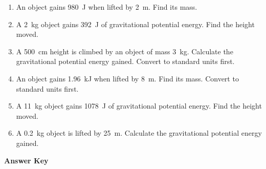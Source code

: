 \documentclass[12pt]{article}
\begin{document}
\begin{enumerate}[itemsep=1.2em]
\item An object gains \SI{980}{\joule} when lifted by \SI{2}{\metre}.  
Find its mass.

\item A \SI{2}{\kilogram} object gains \SI{392}{\joule} of gravitational potential energy.  
Find the height moved.

\item A \SI{500}{\centi\metre} height is climbed by an object of mass \SI{3}{\kilogram}.  
Calculate the gravitational potential energy gained. Convert to standard units first.

\item An object gains \SI{1.96}{\kilo\joule} when lifted by \SI{8}{\metre}.  
Find its mass. Convert to standard units first.

\item A \SI{11}{\kilogram} object gains \SI{1078}{\joule} of gravitational potential energy.  
Find the height moved.

\item A \SI{0.2}{\kilogram} object is lifted by \SI{25}{\metre}.  
Calculate the gravitational potential energy gained.

\end{enumerate}

\newpage

\begin{center}
    {\LARGE \textbf{Answer Key}}
\end{center}

\vspace{0.5cm}
\end{document}
